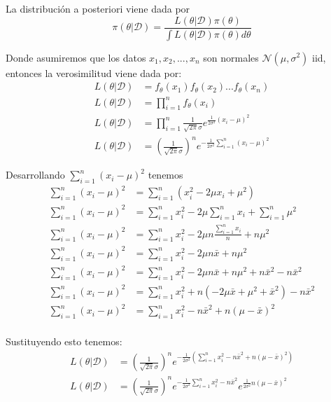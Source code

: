 \documentclass[12pt,]{article}
\begin{document}
La distribución a posteriori viene dada por
\[\pi(\theta|\mathcal{D})=\frac{L(\theta|\mathcal{D})\pi(\theta)}{\int L(\theta|\mathcal{D})\pi(\theta)d\theta}\]

Donde asumiremos que los datos \(x_1,x_2,...,x_n\) son normales
\(\mathcal{N}(\mu,\sigma^2)\) iid, entonces la verosimilitud viene dada
por: \[
\begin{array}{rl}
L(\theta|\mathcal{D}) & = f_\theta(x_1)f_\theta(x_2)...f_\theta(x_n)\\
L(\theta|\mathcal{D}) & = \prod_{i=1}^n f_\theta(x_i)\\
L(\theta|\mathcal{D}) & = \prod_{i=1}^n \frac{1}{\sqrt{2\pi}\sigma}e^{\frac{1}{2\sigma^2}(x_i-\mu)^2}\\
L(\theta|\mathcal{D}) & = \left( \frac{1}{\sqrt{2\pi}\sigma} \right)^n e^{-\frac{1}{2\sigma^2}\sum_{i=1}^n(x_i-\mu)^2}
\end{array}
\]

Desarrollando \(\sum_{i=1}^n(x_i-\mu)^2\) tenemos \[
\begin{array}{rl}
\sum_{i=1}^n(x_i-\mu)^2 & = \sum_{i=1}^n (x_i^2-2\mu x_i +\mu^2)\\
\sum_{i=1}^n(x_i-\mu)^2 & = \sum_{i=1}^n x_i^2-2\mu \sum_{i=1}^n x_i +\sum_{i=1}^n\mu^2\\
\sum_{i=1}^n(x_i-\mu)^2 & = \sum_{i=1}^n x_i^2-2\mu n\frac{\sum_{i=1}^n x_i}{n} +n\mu^2\\
\sum_{i=1}^n(x_i-\mu)^2 & = \sum_{i=1}^n x_i^2-2\mu n\bar x +n\mu^2\\
\sum_{i=1}^n(x_i-\mu)^2 & = \sum_{i=1}^n x_i^2-2\mu n\bar x +n\mu^2 +n\bar x^2 - n\bar x^2\\
\sum_{i=1}^n(x_i-\mu)^2 & = \sum_{i=1}^n x_i^2+n(-2\mu \bar x +\mu^2 +\bar x^2) - n\bar x^2\\
\sum_{i=1}^n(x_i-\mu)^2 & = \sum_{i=1}^n x_i^2 - n\bar x^2 + n(\mu -\bar x)^2 \\
\end{array}
\]

Sustituyendo esto tenemos: \[
\begin{array}{rl}
L(\theta|\mathcal{D}) & = \left( \frac{1}{\sqrt{2\pi}\sigma} \right)^n e^{-\frac{1}{2\sigma^2}\left(\sum_{i=1}^n x_i^2 - n\bar x^2 + n(\mu -\bar x)^2\right)}\\
L(\theta|\mathcal{D}) & =\left( \frac{1}{\sqrt{2\pi}\sigma} \right)^n e^{-\frac{1}{2\sigma^2}\sum_{i=1}^n x_i^2 - n\bar x^2 }e^{\frac{1}{2\sigma^2} n(\mu -\bar x)^2}\\
\end{array}
\]
\end{document}
